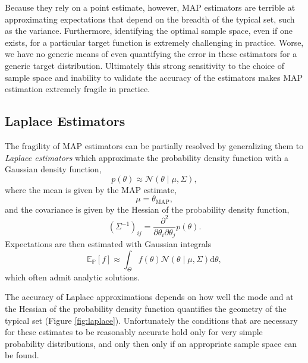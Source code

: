 \documentclass[11pt, oneside]{article}
\newcommand{\dd}{ \mathrm{d} }
\newcommand{\PP}{ \mathbb{P} }
\begin{document}
Because they rely on a point estimate, however, MAP estimators are 
terrible at approximating expectations that depend on the breadth of 
the typical set, such as the variance.  Furthermore, identifying the optimal 
sample space, even if one exists, for a particular target function is 
extremely challenging in practice.  Worse, we have no generic means
of even quantifying the error in these estimators for a generic target
distribution.  Ultimately this strong sensitivity to the choice of sample 
space and inability to validate the accuracy of the estimators makes MAP
estimation extremely fragile in practice.

\subsection{Laplace Estimators}

The fragility of MAP estimators can be partially resolved by generalizing
them to \emph{Laplace estimators} which approximate the probability
density function with a Gaussian density function,
%
\begin{equation*}
p \! \left( \theta \right) \approx 
\mathcal{N} \! \left( \theta \mid \mu, \Sigma \right),
\end{equation*}
%
where the mean is given by the MAP estimate,
%
\begin{equation*}
\mu = \theta_{\mathrm{MAP}},
\end{equation*}
%
and the covariance is given by the Hessian of the probability density 
function,
%
\begin{equation*}
\left( \Sigma^{-1} \right)_{ij} = 
\frac{ \partial^{2} }{ \partial \theta_{i} \partial \theta_{j} }
p \! \left( \theta \right).
\end{equation*}
%
Expectations are then estimated with Gaussian integrals
%
\begin{equation*}
\mathbb{E}_{\PP} \! \left[ f \right]
\approx 
\int_{\Theta} f \! \left( \theta \right) 
\mathcal{N} \! \left( \theta \mid \mu, \Sigma \right) \dd \theta,
\end{equation*}
%
which often admit analytic solutions.

The accuracy of Laplace approximations depends on how well the
mode and at the Hessian of the probability density function
quantifies the geometry of the typical set (Figure \ref{fig:laplace}).
Unfortunately the conditions that are necessary for these estimates
to be reasonably accurate hold only for very simple probability
distributions, and only then only if an appropriate sample space
can be found.  
\end{document}
